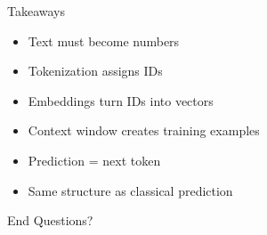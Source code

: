 \documentclass[
  ignorenonframetext,
]{beamer}
\providecommand{\tightlist}{%
  \setlength{\itemsep}{0pt}\setlength{\parskip}{0pt}}
\begin{document}
\begin{frame}{Takeaways}
\label{takeaways}
\begin{itemize}
\tightlist
\item
  Text must become numbers\\
\item
  Tokenization assigns IDs\\
\item
  Embeddings turn IDs into vectors\\
\item
  Context window creates training examples\\
\item
  Prediction = next token\\
\item
  Same structure as classical prediction
\end{itemize}
\end{frame}

\begin{frame}{End}
\label{end}
Questions?
\end{frame}
\end{document}
